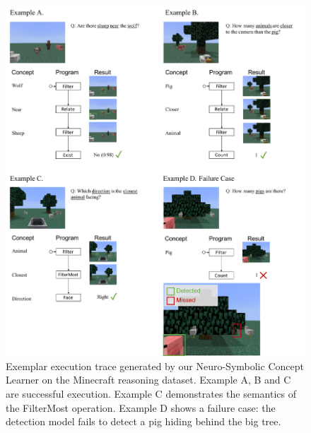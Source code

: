 \documentclass{article} %
\begin{document}
{\begin{figure}[ht]
    \centering
    \includegraphics[width=\textwidth]{raw/MCInference.pdf}
    \caption{Exemplar execution trace generated by our Neuro-Symbolic Concept Learner on the Minecraft reasoning dataset. Example A, B and C are successful execution. Example C demonstrates the semantics of the FilterMost operation. Example D shows a failure case: the detection model fails to detect a pig hiding behind the big tree.}
    \label{fig:vis:mc}
\end{figure}

}
\end{document}
